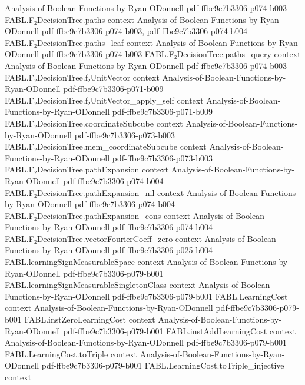 \begin{theorem}
  {Analysis-of-Boolean-Functions-by-Ryan-ODonnell}
  {pdf-ffbe9c7b3306-p074-b003}
\proofstep
  {FABL.F₂DecisionTree.paths}
  {context}
  {Analysis-of-Boolean-Functions-by-Ryan-ODonnell}
  {pdf-ffbe9c7b3306-p074-b003,
    pdf-ffbe9c7b3306-p074-b004}
\proofstep
  {FABL.F₂DecisionTree.paths_leaf}
  {context}
  {Analysis-of-Boolean-Functions-by-Ryan-ODonnell}
  {pdf-ffbe9c7b3306-p074-b003}
\proofstep
  {FABL.F₂DecisionTree.paths_query}
  {context}
  {Analysis-of-Boolean-Functions-by-Ryan-ODonnell}
  {pdf-ffbe9c7b3306-p074-b003}
\proofstep
  {FABL.F₂DecisionTree.f₂UnitVector}
  {context}
  {Analysis-of-Boolean-Functions-by-Ryan-ODonnell}
  {pdf-ffbe9c7b3306-p071-b009}
\proofstep
  {FABL.F₂DecisionTree.f₂UnitVector_apply_self}
  {context}
  {Analysis-of-Boolean-Functions-by-Ryan-ODonnell}
  {pdf-ffbe9c7b3306-p071-b009}
\proofstep
  {FABL.F₂DecisionTree.coordinateSubcube}
  {context}
  {Analysis-of-Boolean-Functions-by-Ryan-ODonnell}
  {pdf-ffbe9c7b3306-p073-b003}
\proofstep
  {FABL.F₂DecisionTree.mem_coordinateSubcube}
  {context}
  {Analysis-of-Boolean-Functions-by-Ryan-ODonnell}
  {pdf-ffbe9c7b3306-p073-b003}
\proofstep
  {FABL.F₂DecisionTree.pathExpansion}
  {context}
  {Analysis-of-Boolean-Functions-by-Ryan-ODonnell}
  {pdf-ffbe9c7b3306-p074-b004}
\proofstep
  {FABL.F₂DecisionTree.pathExpansion_nil}
  {context}
  {Analysis-of-Boolean-Functions-by-Ryan-ODonnell}
  {pdf-ffbe9c7b3306-p074-b004}
\proofstep
  {FABL.F₂DecisionTree.pathExpansion_cons}
  {context}
  {Analysis-of-Boolean-Functions-by-Ryan-ODonnell}
  {pdf-ffbe9c7b3306-p074-b004}
\proofstep
  {FABL.F₂DecisionTree.vectorFourierCoeff_zero}
  {context}
  {Analysis-of-Boolean-Functions-by-Ryan-ODonnell}
  {pdf-ffbe9c7b3306-p025-b004}
\proofstep
  {FABL.learningSignMeasurableSpace}
  {context}
  {Analysis-of-Boolean-Functions-by-Ryan-ODonnell}
  {pdf-ffbe9c7b3306-p079-b001}
\proofstep
  {FABL.learningSignMeasurableSingletonClass}
  {context}
  {Analysis-of-Boolean-Functions-by-Ryan-ODonnell}
  {pdf-ffbe9c7b3306-p079-b001}
\proofstep
  {FABL.LearningCost}
  {context}
  {Analysis-of-Boolean-Functions-by-Ryan-ODonnell}
  {pdf-ffbe9c7b3306-p079-b001}
\proofstep
  {FABL.instZeroLearningCost}
  {context}
  {Analysis-of-Boolean-Functions-by-Ryan-ODonnell}
  {pdf-ffbe9c7b3306-p079-b001}
\proofstep
  {FABL.instAddLearningCost}
  {context}
  {Analysis-of-Boolean-Functions-by-Ryan-ODonnell}
  {pdf-ffbe9c7b3306-p079-b001}
\proofstep
  {FABL.LearningCost.toTriple}
  {context}
  {Analysis-of-Boolean-Functions-by-Ryan-ODonnell}
  {pdf-ffbe9c7b3306-p079-b001}
\proofstep
  {FABL.LearningCost.toTriple_injective}
  {context}

\end{theorem}
